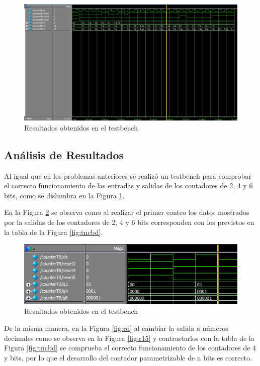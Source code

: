 \documentclass[journal]{IEEEtran}
\begin{document}
	\begin{figure}[htb]
		\centering
		\includegraphics[scale = 0.25]{img/p3/rsc.png}
		\caption{Resultados obtenidos en el testbench}
		\label{fig:rsc}
	\end{figure}
	
	\subsection{Análisis de Resultados}
	
	Al igual que en los problemas anteriores se realizó un testbench para comprobar el correcto funcionamiento de las entradas y salidas de los contadores de 2, 4 y 6 bits, como se dislumbra en la Figura \ref{fig:rsc}.
	
	En la Figura \ref{fig:r1} se observa como al realizar el primer conteo los datos mostrados por la salidas de los contadores de 2, 4 y 6 bits corresponden con los previstos en la tabla de la Figura \ref{fig:tncbd}.
	
	\begin{figure}[htb]
		\centering
		\includegraphics[scale = 0.4]{img/p3/r1.png}
		\caption{Resultados obtenidos en el testbench }
		\label{fig:r1}
	\end{figure}
	
	De la misma manera, en la Figura \ref{fig:rd} al cambiar la salida a números decimales como se observa en la Figura \ref{fig:r15} y contrastarlos con la tabla de la Figura \ref{fig:tncbd} se comprueba el correcto funcionamiento de los contadores de 4 y  bits, por lo que el desarrollo del contador parametrizable de n bits es correcto.
	
\end{document}
